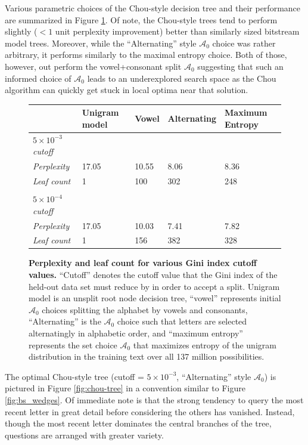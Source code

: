 \documentclass[12pt]{article}
\begin{document}
Various parametric choices of the Chou-style decision tree and their
performance are summarized in Figure \ref{fig:stop-cutoff}. Of note,
the Chou-style trees tend to perform slightly ($< 1$ unit perplexity
improvement) better than similarly sized bitstream model
trees. Moreover, while the ``Alternating'' style $\mathcal{A}_0$
choice was rather arbitrary, it performs similarly to the maximal
entropy choice. Both of those, however, out perform the
vowel+consonant split $\mathcal{A}_0$ suggesting that such an informed
choice of $\mathcal{A}_0$ leads to an underexplored search space as
the Chou algorithm can quickly get stuck in local optima near that
solution.

\begin{figure}
  \centering
  \begin{tabularx}{\textwidth}{ lXXXX }
    & Unigram model & Vowel & Alternating & Maximum Entropy \\
    \toprule
    \textit{$5\times10^{-3}$ cutoff} & & & & \\
    \midrule
    \textit{Perplexity} & 17.05 & 10.55 & 8.06 & 8.36 \\
    \textit{Leaf count} & 1     & 100   & 302  & 248  \\
    \\
    \textit{$5\times10^{-4}$ cutoff} & & & & \\
    \midrule
    \textit{Perplexity} & 17.05 & 10.03 & 7.41 & 7.82 \\
    \textit{Leaf count} & 1     & 156   & 382  & 328  \\
    \bottomrule
  \end{tabularx}
  \caption{\textbf{Perplexity and leaf count for various Gini index
      cutoff values.} ``Cutoff'' denotes the cutoff value that the
    Gini index of the held-out data set must reduce by in order to
    accept a split. Unigram model is an unsplit root node decision
    tree, ``vowel'' represents initial $\mathcal{A}_0$ choices
    splitting the alphabet by vowels and consonants, ``Alternating''
    is the $\mathcal{A}_0$ choice such that letters are selected
    alternatingly in alphabetic order, and ``maximum entropy''
    represents the set choice $\mathcal{A}_0$ that maximizes entropy
    of the unigram distribution in the training text over all 137
    million possibilities.}
  \label{fig:stop-cutoff}
\end{figure}

The optimal Chou-style tree (cutoff = $5\times10^{-3}$,
``Alternating'' style $\mathcal{A}_0$) is pictured in Figure
\ref{fig:chou-tree} in a convention similar to Figure
\ref{fig:bs_wedges}. Of immediate note is that the strong tendency to
query the most recent letter in great detail before considering the
others has vanished. Instead, though the most recent letter dominates
the central branches of the tree, questions are arranged with greater
variety. 
\end{document}
